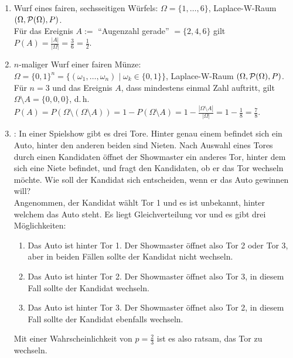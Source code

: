 \begin{Bsp}
    \begin{enumerate}
        \item
        Wurf eines fairen, sechsseitigen Würfels:
        $\Omega = \{1, \dotsc, 6\}$, Laplace-W-Raum $(\Omega, \P(\Omega), P)$.\\
        Für das Ereignis $A :=$ "`Augenzahl gerade"' $= \{2, 4, 6\}$ gilt
        $P(A) = \frac{|A|}{|\Omega|} = \frac{3}{6} = \frac{1}{2}$.
        
        \item
        $n$-maliger Wurf einer fairen Münze:\\
        $\Omega = \{0, 1\}^n = \{(\omega_1, \dotsc, \omega_n) \;|\; \omega_k \in \{0, 1\}\}$,
        Laplace-W-Raum $(\Omega, \P(\Omega), P)$.\\
        Für $n = 3$ und das Ereignis $A$, dass mindestens einmal Zahl auftritt, gilt
        $\Omega \setminus A = \{0, 0, 0\}$, d.\,h.
        $P(A) = P(\Omega \setminus (\Omega \setminus A)) = 1 - P(\Omega \setminus A) =
        1 - \frac{|\Omega \setminus A|}{|\Omega|} = 1 - \frac{1}{8} = \frac{7}{8}$.
        
        \item
        :
        In einer Spielshow gibt es drei Tore.
        Hinter genau einem befindet sich ein Auto, hinter den anderen beiden sind Nieten.
        Nach Auswahl eines Tores durch einen Kandidaten öffnet der Showmaster ein anderes Tor,
        hinter dem sich eine Niete befindet, und fragt den Kandidaten, ob er das Tor wechseln
        möchte.
        Wie soll der Kandidat sich entscheiden, wenn er das Auto gewinnen will?\\
        Angenommen, der Kandidat wählt Tor 1 und es ist unbekannt, hinter welchem das Auto steht.
        Es liegt Gleichverteilung vor und es gibt drei Möglichkeiten:
        \begin{enumerate}[label=\arabic*.]
            \item
            Das Auto ist hinter Tor 1.
            Der Showmaster öffnet also Tor 2 oder Tor 3, aber in beiden Fällen sollte der Kandidat
            nicht wechseln.
            
            \item
            Das Auto ist hinter Tor 2.
            Der Showmaster öffnet also Tor 3, in diesem Fall sollte der Kandidat wechseln.
            
            \item
            Das Auto ist hinter Tor 3.
            Der Showmaster öffnet also Tor 2,
            in diesem Fall sollte der Kandidat ebenfalls wechseln.
        \end{enumerate}
        Mit einer Wahrscheinlichkeit von $p = \frac{2}{3}$ ist es also ratsam, das Tor zu wechseln.
    \end{enumerate}
\end{Bsp}

